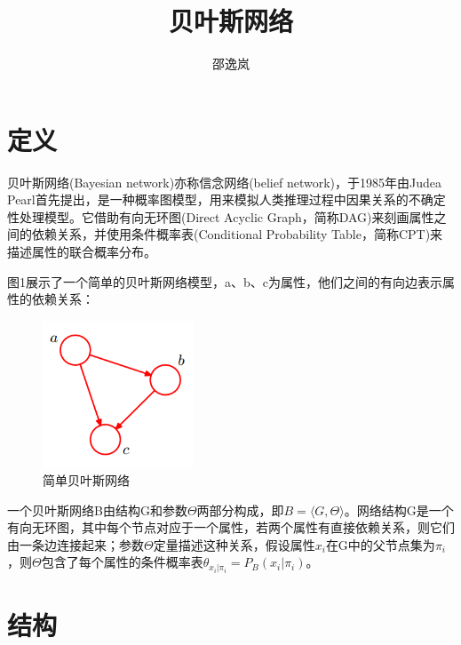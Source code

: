 \documentclass[11pt]{article}
\title{ \textbf{贝叶斯网络} }
\author{
	邵逸岚  \qquad 21721121
}
\date{ }
\begin{document}
	
	\maketitle
	\section{定义}
		贝叶斯网络(Bayesian network)亦称信念网络(belief network)，于1985年由Judea Pearl首先提出，是一种概率图模型，用来模拟人类推理过程中因果关系的不确定性处理模型。它借助有向无环图(Direct Acyclic Graph，简称DAG)来刻画属性之间的依赖关系，并使用条件概率表(Conditional Probability Table，简称CPT)来描述属性的联合概率分布。\par
		图1展示了一个简单的贝叶斯网络模型，a、b、c为属性，他们之间的有向边表示属性的依赖关系：\par
		\begin{figure}[htbp]
			\centering
			\includegraphics[width=0.4\textwidth]{img/simple_bn.png}
			\caption{简单贝叶斯网络}
			\label{001}
		\end{figure}
		一个贝叶斯网络B由结构G和参数$\Theta$两部分构成，即$B=\langle G,\Theta\rangle$。网络结构G是一个有向无环图，其中每个节点对应于一个属性，若两个属性有直接依赖关系，则它们由一条边连接起来；参数$\Theta$定量描述这种关系，假设属性$x_i$在G中的父节点集为$\pi_i$，则$\Theta$包含了每个属性的条件概率表$\theta_{x_i|\pi_i}=P_B(x_i|\pi_i)$。\par
		
	\section{结构}
\end{document}
